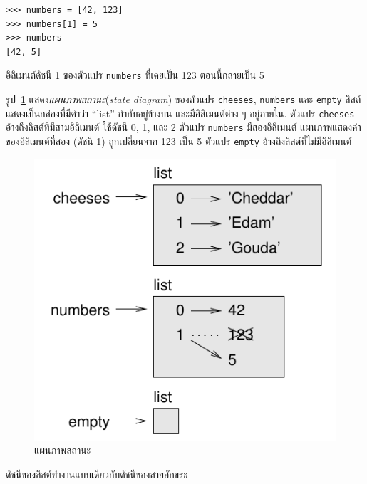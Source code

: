 \begin{verbatim}
>>> numbers = [42, 123]
>>> numbers[1] = 5
>>> numbers
[42, 5]
\end{verbatim}
%
อิลิเมนต์ดัชนี 1 ของตัวแปร \texttt{numbers}
ที่เคยเป็น 123 ตอนนี้กลายเป็น 5

รูป~\ref{fig.liststate} 
แสดง\textit{แผนภาพสถานะ}(\textit{state diagram})
ของตัวแปร \texttt{cheeses}, 
\texttt{numbers} 
และ \texttt{empty}
%
ลิสต์แสดงเป็นกล่องที่มีคำว่า ``list'' กำกับอยู่ข้างบน
และมีอิลิเมนต์ต่าง ๆ อยู่ภายใน.
ตัวแปร \texttt{cheeses} อ้างถึงลิสต์ที่มีสามอิลิเมนต์ ใช้ดัชนี 0, 1, และ 2
ตัวแปร \texttt{numbers} มีสองอิลิเมนต์
แผนภาพแสดงค่าของอิลิเมนต์ที่สอง (ดัชนี 1) ถูกเปลี่ยนจาก 123 เป็น 5
ตัวแปร \texttt{empty} อ้างถึงลิสต์ที่ไม่มีอิลิเมนต์

\begin{figure}
\centerline
{\includegraphics[scale=0.8]{figs/liststate.pdf}}
\caption{แผนภาพสถานะ}
\label{fig.liststate}
\end{figure}

ดัชนีของลิสต์ทำงานแบบเดียวกับดัชนีของสายอักขระ


